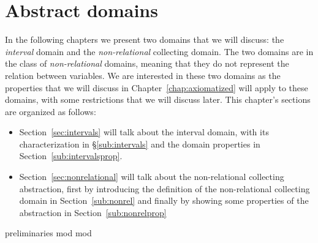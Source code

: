 \chapter{Abstract domains}
\label{chap:abstractdomains}


In the following chapters we present two domains that we will discuss:
the \emph{interval} domain and the \emph{non-relational} collecting
domain. The two domains are in the class of \emph{non-relational}
domains, meaning that they do not represent the relation between
variables.  We are interested in these two domains as the
properties that we will discuss in Chapter~\ref{chap:axiomatized} will
apply to these domains, with some restrictions that we will discuss
later.  This chapter's sections are organized as follows:

\begin{itemize}
\item Section~\ref{sec:intervals} will talk about the interval domain,
  with its characterization in \S\ref{sub:intervals} and the domain
  properties in Section~\ref{sub:intervalsprop}.
\item Section~\ref{sec:nonrelational} will talk about the
  non-relational collecting abstraction, first by introducing the
  definition of the non-relational collecting domain in
  Section~\ref{sub:nonrel} and finally by showing some properties of
  the abstraction in Section~\ref{sub:nonrelprop}
\end{itemize}

{preliminaries}
{mod}
{mod}

